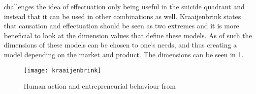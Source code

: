 \citet{doi:10.1108/S1876-0228(2012)0000009015} challenges the idea of effectuation only being useful in the suicide quadrant and instead that it can be used in other combinations as well.
Kraaijenbrink states that causation and effectuation should be seen as two extremes and it is more beneficial to look at the dimension values that define these models.
As of such the dimensions of these models can be chosen to one's needs, and thus creating a model depending on the market and product.
The dimensions can be seen in \cref{fig:kraaijenbrink}.

\begin{figure}[!htb]
	\centering
	\texttt{[image: kraaijenbrink]}
	\caption{Human action and entrepreneurial behaviour from \citet{doi:10.1108/S1876-0228(2012)0000009015}}
	\label{fig:kraaijenbrink}
\end{figure}

